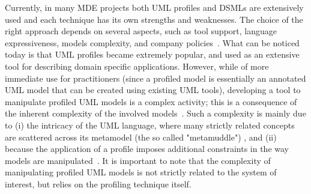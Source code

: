 Currently, in many MDE projects both UML profiles and DSMLs are extensively used and each technique has its own strengths and weaknesses.
The choice of the right approach depends on several aspects, such as tool support, language expressiveness,
models complexity, and company policies~\cite{comparison}.
What can be noticed today is that UML profiles became extremely popular, and used as an extensive tool for describing domain specific
applications.
However, while of more immediate use for practitioners (since a profiled model is essentially an annotated UML model that can be
created using existing UML tools), developing a tool to manipulate profiled UML models is a complex activity; this is a consequence
of the inherent complexity of the involved models~\cite{comparison}\cite{france}.
Such a complexity is mainly due to
(i) the intricacy of the UML language, where many strictly related concepts are scattered across its metamodel (the so called "metamuddle"\cite{france})
, and (ii) because the application of a profile imposes additional constraints in the way models are manipulated~\cite{UMLprofile}.
It is important to note that the complexity of manipulating profiled UML models is not strictly related to
the system of interest, but relies on the profiling technique itself.

